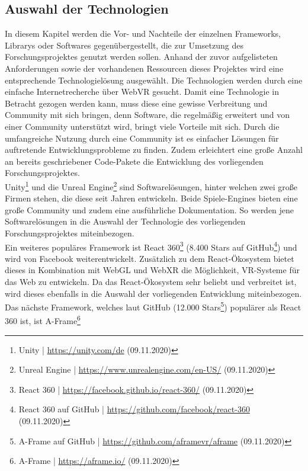 \documentclass[a4paper,12pt,oneside]{article}
\begin{document}
    \subsection{Auswahl der Technologien}
      In diesem Kapitel werden die Vor- und Nachteile der einzelnen Frameworks, Librarys
      oder Softwares gegenübergestellt, die zur Umsetzung des Forschungsprojektes genutzt
      werden sollen. Anhand der zuvor aufgelisteten Anforderungen sowie der vorhandenen
      Ressourcen dieses Projektes wird eine entsprechende Technologielösung 
      ausgewählt.
      Die Technologien werden durch eine einfache Internetrecherche über WebVR gesucht.
      Damit eine Technologie in Betracht gezogen werden kann, muss diese eine gewisse
      Verbreitung und Community mit sich bringen, denn Software, die regelmäßig erweitert
      und von einer Community unterstützt wird, bringt viele Vorteile mit sich. 
      Durch die umfangreiche Nutzung durch eine Community ist es einfacher Lösungen
      für auftretende Entwicklungsprobleme zu finden. Zudem erleichtert eine große
      Anzahl an bereits geschriebener Code-Pakete die Entwicklung des vorliegenden 
      Forschungsprojektes. \\
      Unity\footnote{Unity | \url{https://unity.com/de} (09.11.2020)} und die 
      Unreal Engine\footnote{Unreal Engine | \url{https://www.unrealengine.com/en-US/} (09.11.2020)} 
      sind Softwarelösungen, hinter welchen zwei große
      Firmen stehen, die diese seit Jahren entwickeln. Beide Spiele-Engines bieten eine
      große Community und zudem eine ausführliche Dokumentation.
      So werden jene Softwarelösungen in die Auswahl der Technologie des vorliegenden
      Forschungsprojektes miteinbezogen. \\
      Ein weiteres populäres Framework ist React 360\footnote{React 360 | \url{https://facebook.github.io/react-360/} (09.11.2020)}
      (8.400 Stars auf GitHub\footnote{React 360 auf GitHub | \url{https://github.com/facebook/react-360} (09.11.2020)})
      und wird von Facebook weiterentwickelt. 
      Zusätzlich zu dem React-Ökosystem bietet dieses in Kombination mit WebGL und WebXR
      die Möglichkeit, VR-Systeme für das Web zu entwickeln.      
      Da das React-Ökosystem sehr beliebt und verbreitet
      ist, wird dieses ebenfalls in die Auswahl der vorliegenden 
      Entwicklung miteinbezogen.\\
      Das nächste Framework, welches laut GitHub (12.000 Stars\footnote{A-Frame auf GitHub | \url{https://github.com/aframevr/aframe} (09.11.2020)}) 
      populärer als React 360 ist, ist A-Frame\footnote{A-Frame | \url{https://aframe.io/} (09.11.2020)}
\end{document}
